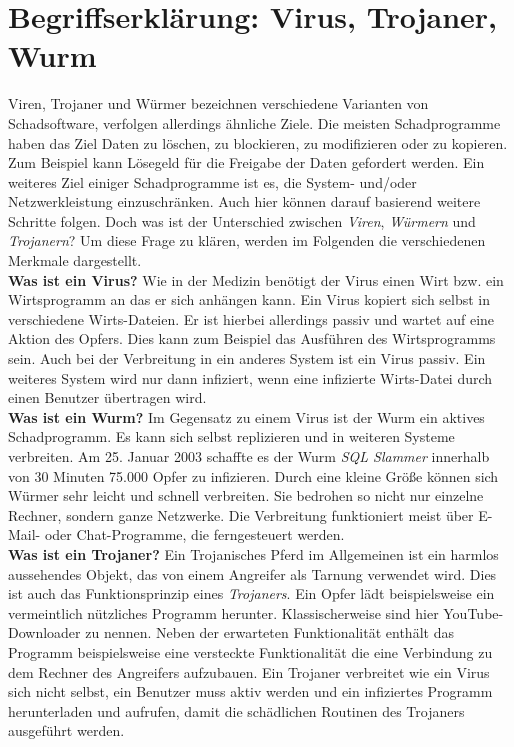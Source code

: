 \section{Begriffserklärung: Virus, Trojaner, Wurm}\label{sec:abgrenzung}
Viren, Trojaner und Würmer bezeichnen verschiedene Varianten von Schadsoftware,
verfolgen allerdings ähnliche Ziele.
Die meisten Schadprogramme haben das Ziel Daten zu löschen, zu blockieren, zu modifizieren oder zu kopieren.
Zum Beispiel kann Lösegeld für die Freigabe der Daten gefordert werden.
Ein weiteres Ziel einiger Schadprogramme ist es, die System- und/oder Netzwerkleistung
einzuschränken. Auch hier können darauf basierend weitere Schritte folgen.
Doch was ist der Unterschied zwischen \textit{Viren}, \textit{Würmern} und \textit{Trojanern}?
Um diese Frage zu klären, werden im Folgenden die verschiedenen Merkmale dargestellt.
\cite{KASTRO}\\

\textbf{Was ist ein Virus?}
Wie in der Medizin benötigt der Virus einen Wirt bzw. ein Wirtsprogramm an das 
er sich anhängen kann. Ein Virus kopiert sich selbst in verschiedene 
Wirts-Dateien. Er ist hierbei allerdings passiv und wartet auf eine Aktion des Opfers. 
Dies kann zum Beispiel das Ausführen des Wirtsprogramms sein. Auch bei der Verbreitung in ein anderes
System ist ein Virus passiv. Ein weiteres System wird nur dann infiziert, wenn
eine infizierte Wirts-Datei durch einen Benutzer übertragen wird. \\

\textbf{Was ist ein Wurm?}
Im Gegensatz zu einem Virus ist der Wurm ein aktives Schadprogramm. Es kann sich
selbst replizieren und in weiteren Systeme verbreiten. Am 25. Januar 2003 schaffte es 
der Wurm \textit{SQL Slammer} innerhalb von 30 Minuten 75.000 Opfer zu infizieren. Durch
eine kleine Größe können sich Würmer sehr leicht und schnell verbreiten. Sie
bedrohen so nicht nur einzelne Rechner, sondern ganze Netzwerke. Die Verbreitung
funktioniert meist über E-Mail- oder Chat-Programme, die ferngesteuert werden.\\

\textbf{Was ist ein Trojaner?}
Ein Trojanisches Pferd im Allgemeinen ist ein harmlos aussehendes Objekt, das von
einem Angreifer als Tarnung verwendet wird. Dies ist auch das Funktionsprinzip eines \textit{Trojaners}. 
Ein Opfer lädt beispielsweise ein vermeintlich nützliches Programm herunter.
Klassischerweise sind hier YouTube-Downloader zu nennen.
Neben der erwarteten Funktionalität enthält
das Programm beispielsweise eine versteckte Funktionalität die eine Verbindung zu dem Rechner
des Angreifers aufzubauen. Ein Trojaner verbreitet wie ein Virus sich nicht selbst, ein Benutzer 
muss aktiv werden und ein infiziertes Programm herunterladen und aufrufen, damit die
schädlichen Routinen des Trojaners ausgeführt werden.
\cite{ABGVT}